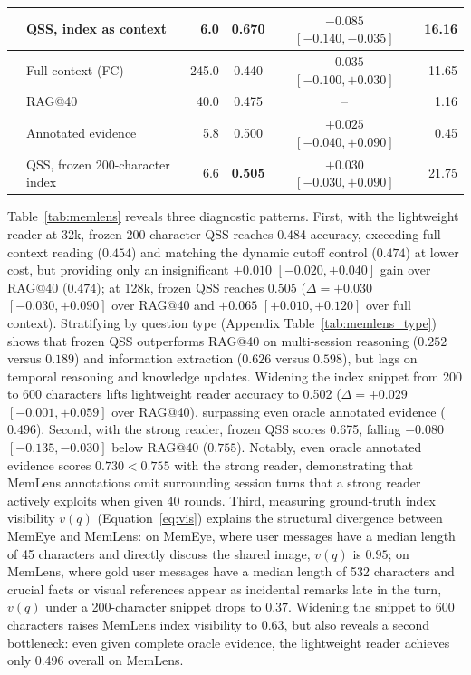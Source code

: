 \documentclass[10pt]{article}
\newcommand{\qss}{QSS}
\begin{document}
\begin{table}[t]
\begin{tabular}{llrccr}
 & \qss{}, index as context & 6.0 & 0.670 & $-0.085$ $[-0.140, -0.035]$ & 16.16 \\
\midrule
{}
 & Full context (FC) & 245.0 & 0.440 & $-0.035$ $[-0.100, +0.030]$ & 11.65 \\
 & RAG@40 & 40.0 & 0.475 & -- & 1.16 \\
 & Annotated evidence & 5.8 & 0.500 & $+0.025$ $[-0.040, +0.090]$ & 0.45 \\
 & \qss{}, frozen 200-character index & 6.6 & \textbf{0.505} & $+0.030$ $[-0.030, +0.090]$ & 21.75 \\
\bottomrule
\end{tabular}
\end{table}

Table~\ref{tab:memlens} reveals three diagnostic patterns. First, with the lightweight reader at 32k, frozen 200-character \qss{} reaches 0.484 accuracy, exceeding full-context reading ($0.454$) and matching the dynamic cutoff control ($0.474$) at lower cost, but providing only an insignificant $+0.010$ $[-0.020, +0.040]$ gain over RAG@40 ($0.474$); at 128k, frozen \qss{} reaches 0.505 ($\Delta = +0.030$ $[-0.030, +0.090]$ over RAG@40 and $+0.065$ $[+0.010, +0.120]$ over full context). Stratifying by question type (Appendix Table~\ref{tab:memlens_type}) shows that frozen \qss{} outperforms RAG@40 on multi-session reasoning ($0.252$ versus $0.189$) and information extraction ($0.626$ versus $0.598$), but lags on temporal reasoning and knowledge updates. Widening the index snippet from 200 to 600 characters lifts lightweight reader accuracy to 0.502 ($\Delta = +0.029$ $[-0.001, +0.059]$ over RAG@40), surpassing even oracle annotated evidence ($0.496$). Second, with the strong reader, frozen \qss{} scores 0.675, falling $-0.080$ $[-0.135, -0.030]$ below RAG@40 ($0.755$). Notably, even oracle annotated evidence scores $0.730 < 0.755$ with the strong reader, demonstrating that MemLens annotations omit surrounding session turns that a strong reader actively exploits when given 40 rounds. Third, measuring ground-truth index visibility $v(q)$ (Equation~\eqref{eq:vis}) explains the structural divergence between MemEye and MemLens: on MemEye, where user messages have a median length of 45 characters and directly discuss the shared image, $v(q)$ is $0.95$; on MemLens, where gold user messages have a median length of 532 characters and crucial facts or visual references appear as incidental remarks late in the turn, $v(q)$ under a 200-character snippet drops to $0.37$. Widening the snippet to 600 characters raises MemLens index visibility to $0.63$, but also reveals a second bottleneck: even given complete oracle evidence, the lightweight reader achieves only 0.496 overall on MemLens.
\end{document}
